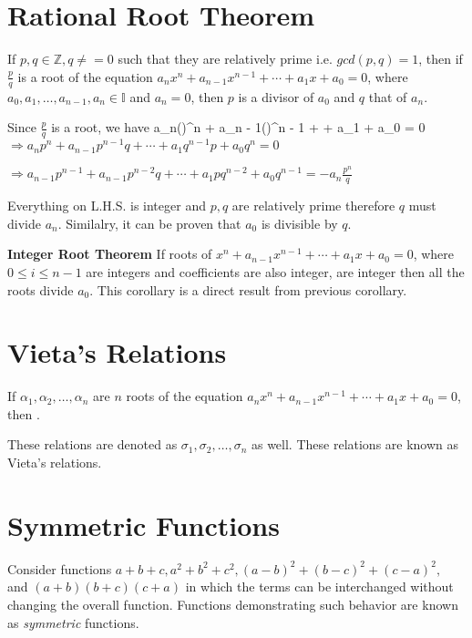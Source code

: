 \section{Rational Root Theorem}
\starttheorem
If $p, q\in\mathbb{Z}, q\neq = 0$ such that they are relatively prime i.e. $gcd(p, q) = 1$, then if
$\frac{p}{q}$ is a root of the equation $a_nx^n + a_{n - 1}x^{n - 1} + \cdots + a_1x + a_0 = 0$, where $a_0,
a_1, \ldots, a_{n - 1}, a_n \in\mathbb{I}$ and $a_n = 0$, then $p$ is a divisor of $a_0$ and $q$ that of
$a_n$.
\stoptheorem

\startproof
  Since $\frac{p}{q}$ is a root, we have
  \startformula a_n\left(\right)^n + a_{n - 1}\left(\right)^{n - 1} + \cdots +
    a_1 + a_0 = 0\stopformula
  $\Rightarrow a_np^n + a_{n - 1}p^{n - 1}q + \cdots + a_1q^{n - 1}p + a_0q^n = 0$

  $\Rightarrow a_{n - 1}p^{n - 1} + a_{n - 1}p^{n - 2}q + \cdots + a_1pq^{n - 2} + a_0q^{n - 1} =
    -a_n\frac{p^n}{q}$

  Everything on L.H.S. is integer and $p, q$ are relatively prime therefore $q$ must divide $a_n$.
  Similalry, it can be proven that $a_0$ is divisible by $q$.
\stopproof

\startcorollary
  {\bf Integer Root Theorem} If roots of $x^n + a_{n - 1}x^{n - 1} + \cdots + a_1x + a_0 = 0$, where $0\leq i\leq n- 1$ are integers
  and coefficients are also integer, are integer then all the roots divide $a_0$.
\stopcorollary
\startproof
  This corollary is a direct result from previous corollary.
\stopproof

\section{Vieta's Relations}
If $\alpha_1, \alpha_2, \ldots, \alpha_n$ are $n$ roots of the equation $a_nx^n + a_{n - 1}x^{n - 1} +
\cdots + a_1x + a_0 = 0$, then .

These relations are denoted as $\sigma_1, \sigma_2, \ldots, \sigma_n$ as well.
These relations are known as Vieta's relations.

\section{Symmetric Functions}
Consider functions $a + b + c, a^2 + b^2 + c^2, (a - b)^2 + (b - c)^2 + (c - a)^2,$ and $(a + b)(b + c)(c +
a)$ in which the terms can be interchanged without changing the overall function. Functions demonstrating
such behavior are known as {\it symmetric} functions.

